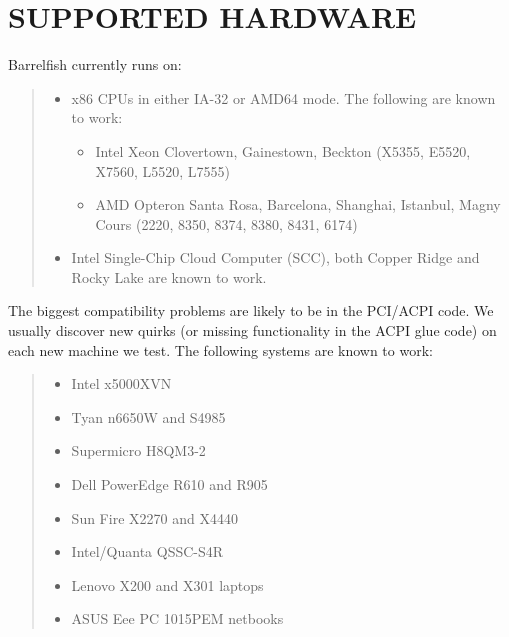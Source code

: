 \section{SUPPORTED HARDWARE%
  \label{supported-hardware}%
}

Barrelfish currently runs on:
%
\begin{quote}
%
\begin{itemize}

\item x86 CPUs in either IA-32 or AMD64 mode. The following are known to work:
%
\begin{itemize}

\item Intel Xeon Clovertown, Gainestown, Beckton (X5355, E5520, X7560, L5520,
L7555)

\item AMD Opteron Santa Rosa, Barcelona, Shanghai, Istanbul, Magny Cours
(2220, 8350, 8374, 8380, 8431, 6174)

\end{itemize}

\item Intel Single-Chip Cloud Computer (SCC), both Copper Ridge and Rocky Lake
are known to work.

\end{itemize}

\end{quote}

The biggest compatibility problems are likely to be in the PCI/ACPI code. We
usually discover new quirks (or missing functionality in the ACPI glue code)
on each new machine we test. The following systems are known to work:
%
\begin{quote}
%
\begin{itemize}

\item Intel x5000XVN

\item Tyan n6650W and S4985

\item Supermicro H8QM3-2

\item Dell PowerEdge R610 and R905

\item Sun Fire X2270 and X4440

\item Intel/Quanta QSSC-S4R

\item Lenovo X200 and X301 laptops

\item ASUS Eee PC 1015PEM netbooks

\end{itemize}

\end{quote}

